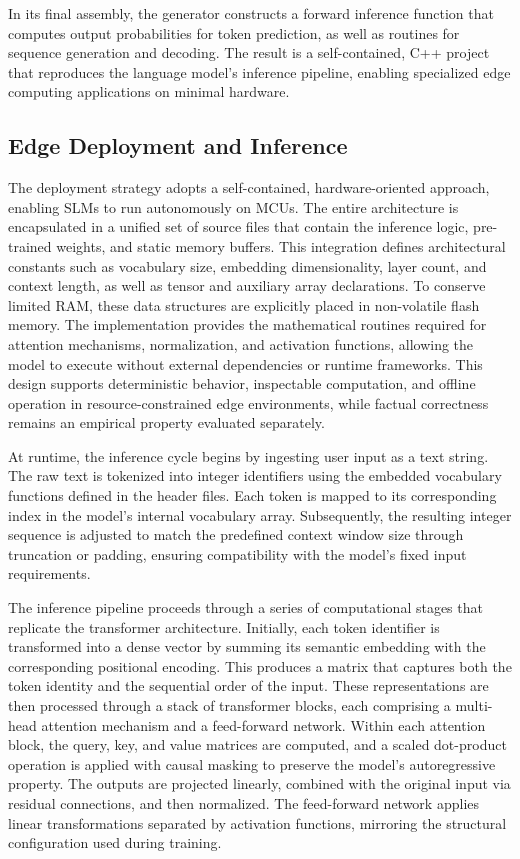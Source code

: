 \documentclass{ieeeaccess}
\begin{document}
In its final assembly, the generator constructs a forward inference function that computes output probabilities for token prediction, as well as routines for sequence generation and decoding. The result is a self-contained, C++ project that reproduces the language model's inference pipeline, enabling specialized edge computing applications on minimal hardware.


\subsection{Edge Deployment and Inference}


The deployment strategy adopts a self-contained, hardware-oriented approach, enabling SLMs to run autonomously on MCUs. The entire architecture is encapsulated in a unified set of source files that contain the inference logic, pre-trained weights, and static memory buffers. This integration defines architectural constants such as vocabulary size, embedding dimensionality, layer count, and context length, as well as tensor and auxiliary array declarations. To conserve limited RAM, these data structures are explicitly placed in non-volatile flash memory. The implementation provides the mathematical routines required for attention mechanisms, normalization, and activation functions, allowing the model to execute without external dependencies or runtime frameworks. This design supports deterministic behavior, inspectable computation, and offline operation in resource-constrained edge environments, while factual correctness remains an empirical property evaluated separately.

At runtime, the inference cycle begins by ingesting user input as a text string. The raw text is tokenized into integer identifiers using the embedded vocabulary functions defined in the header files. Each token is mapped to its corresponding index in the model’s internal vocabulary array. Subsequently, the resulting integer sequence is adjusted to match the predefined context window size through truncation or padding, ensuring compatibility with the model’s fixed input requirements.

The inference pipeline proceeds through a series of computational stages that replicate the transformer architecture. Initially, each token identifier is transformed into a dense vector by summing its semantic embedding with the corresponding positional encoding. This produces a matrix that captures both the token identity and the sequential order of the input. These representations are then processed through a stack of transformer blocks, each comprising a multi-head attention mechanism and a feed-forward network. Within each attention block, the query, key, and value matrices are computed, and a scaled dot-product operation is applied with causal masking to preserve the model's autoregressive property. The outputs are projected linearly, combined with the original input via residual connections, and then normalized. The feed-forward network applies linear transformations separated by activation functions, mirroring the structural configuration used during training.
\end{document}
